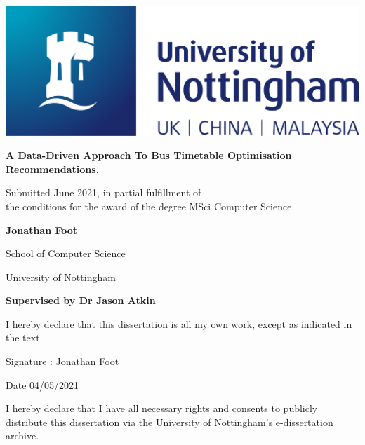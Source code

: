 \documentclass{article}
\begin{document}
\begin{titlepage}
	\begin{center}
		
		  	\includegraphics[width=0.5\columnwidth]{images/nottingham-logo.png}
		
		\vskip 1in 
		\par 
		\LARGE {\bf A Data-Driven Approach To Bus Timetable Optimisation Recommendations.}
		
		\vskip 0.5in \par
		\large {Submitted June 2021, in partial fulfillment of \\ the conditions for the award of the degree MSci Computer Science.}
		

		\vskip 0.3in \par
		\large {\bf Jonathan Foot} \\
		
		\large { School of Computer Science \par
		University of Nottingham}
		
		
		\vskip 0.3in \par
		\large {\bf Supervised by Dr Jason Atkin}
		\vskip 0.3in \par
	
		
		\vskip 0.5in \par
		\normalsize {I hereby declare that this dissertation is all my own work, except as indicated in the text. }
		
		\vskip 0.5in 
		\normalsize {Signature : Jonathan Foot}
		
		\vskip 0.1in
		\normalsize {Date 04/05/2021}
		
		
		\vskip 0.4in \par
		\normalsize {I hereby declare that I have all necessary rights and consents to publicly distribute this dissertation via the University of Nottingham's e-dissertation archive.}
		
			
	
	\end{center}
\end{titlepage}

\newpage

\end{document}
